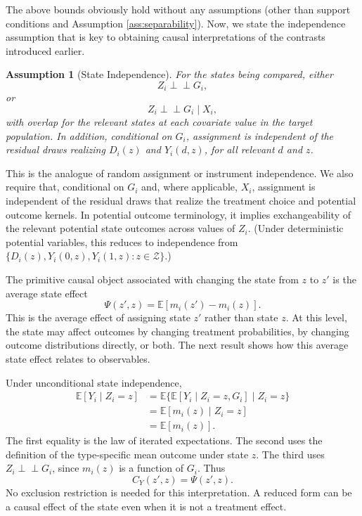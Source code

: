 \documentclass[11pt]{article}
\newtheorem{assumption}{Assumption}
\newcommand{\E}{\mathbb{E}}
\newcommand{\1}{\mathbf{1}}
\newcommand{\Perp}{\perp \!\!\! \perp}
\begin{document}
 The above bounds obviously hold without any assumptions (other than support conditions and Assumption \ref{ass:separability}). Now, we state the independence assumption that is key to obtaining causal interpretations of the contrasts introduced earlier.
\begin{assumption}[State Independence]
\label{ass:stateindependence}
For the states being compared, either
\[
        Z_i\Perp G_i,
\]
or
\[
        Z_i\Perp G_i\mid X_i,
\]
with overlap for the relevant states at each covariate value in the target population. In addition, conditional on \(G_i\), assignment is independent of the residual draws realizing \(D_i(z)\) and \(Y_i(d,z)\), for all relevant \(d\) and \(z\).
\end{assumption}
This is the analogue of random assignment or instrument independence.   We also require that, conditional on $G_i$ and, where applicable, $X_i$, assignment is independent of the residual draws that realize the treatment choice and potential outcome kernels. In potential outcome terminology, it implies exchangeability of the relevant potential state outcomes across values of $Z_i$. (Under deterministic potential variables, this reduces to independence from
$\{D_i(z),Y_i(0,z),Y_i(1,z):z\in\mathcal Z\}$.)

The primitive causal object associated with changing the state from $z$ to $z'$ is the average state effect
\begin{equation}
        \Psi(z',z)=\E[m_i(z')-m_i(z)].
        \label{eq:stateeffect}
\end{equation}
This is the average effect of assigning state $z'$ rather than state $z$. At this level, the state may affect outcomes by changing treatment probabilities, by changing outcome distributions directly, or both. The next result shows how this average state effect relates to observables. 

Under unconditional state independence,
\begin{align*}
        \E[Y_i\mid Z_i=z]
        &=\E\{\E[Y_i\mid Z_i=z,G_i]\mid Z_i=z\} \\
        &=\E[m_i(z)\mid Z_i=z] \\
        &=\E[m_i(z)].
\end{align*}
The first equality is the law of iterated expectations. The second uses the definition of the type-specific mean outcome under state $z$. The third uses $Z_i\Perp G_i$, since $m_i(z)$ is a function of $G_i$. Thus
\[
        C_Y(z',z)=\Psi(z',z).
\]
No exclusion restriction is needed for this interpretation. A reduced form can be a causal effect of the state even when it is not a treatment effect.
\end{document}
